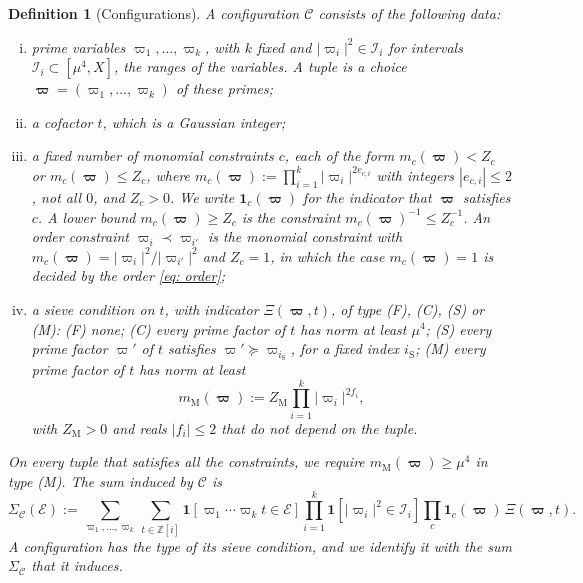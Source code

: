 \documentclass{article}
\numberwithin{equation}{section}
\newtheorem{definition}{Definition}
\newcommand{\Le}{\leqslant}
\newcommand{\Ge}{\geqslant}
\begin{document}
\begin{definition}[Configurations]
\label{def: configuration}
A \emph{configuration} $\mathcal{C}$ consists of the following data:
\begin{enumerate}[(i)]
\item prime variables $\varpi_1, \dots, \varpi_k$, with $k$ fixed and $|\varpi_i|^2 \in \mathcal{I}_i$ for intervals $\mathcal{I}_i \subset [\mu^4, X]$, the \emph{ranges} of the variables. A \emph{tuple} is a choice $\boldsymbol{\varpi} = (\varpi_1, \dots, \varpi_k)$ of these primes;
\item a cofactor $t$, which is a Gaussian integer;
\item a fixed number of \emph{monomial constraints} $c$, each of the form $m_c(\boldsymbol{\varpi}) < Z_c$ or $m_c(\boldsymbol{\varpi}) \Le Z_c$, where $m_c(\boldsymbol{\varpi}) := \prod_{i=1}^{k} |\varpi_i|^{2e_{c,i}}$ with integers $|e_{c,i}| \Le 2$, not all $0$, and $Z_c > 0$. We write $\mathbf{1}_c(\boldsymbol{\varpi})$ for the indicator that $\boldsymbol{\varpi}$ satisfies $c$. A lower bound $m_c(\boldsymbol{\varpi}) \Ge Z_c$ is the constraint $m_c(\boldsymbol{\varpi})^{-1} \Le Z_c^{-1}$. An \emph{order constraint} $\varpi_i \prec \varpi_{i'}$ is the monomial constraint with $m_c(\boldsymbol{\varpi}) = |\varpi_i|^2/|\varpi_{i'}|^2$ and $Z_c = 1$, in which the case $m_c(\boldsymbol{\varpi}) = 1$ is decided by the order \eqref{eq: order};
\item a \emph{sieve condition} on $t$, with indicator $\Xi(\boldsymbol{\varpi}, t)$, of \emph{type} (F), (C), (S) or (M): (F) none; (C) every prime factor of $t$ has norm at least $\mu^4$; (S) every prime factor $\varpi'$ of $t$ satisfies $\varpi' \succcurlyeq \varpi_{i_{\mathrm{S}}}$, for a fixed index $i_{\mathrm{S}}$; (M) every prime factor of $t$ has norm at least
\begin{equation}
\label{eq: type M level}
m_{\mathrm{M}}(\boldsymbol{\varpi}) := Z_{\mathrm{M}} \prod_{i=1}^{k} |\varpi_i|^{2f_i},
\end{equation}
with $Z_{\mathrm{M}} > 0$ and reals $|f_i| \Le 2$ that do not depend on the tuple.
\end{enumerate}
On every tuple that satisfies all the constraints, we require $m_{\mathrm{M}}(\boldsymbol{\varpi}) \Ge \mu^4$ in type (M). The \emph{sum induced by} $\mathcal{C}$ is
\begin{equation}
\label{eq: configuration sum}
\Sigma_{\mathcal{C}}(\mathcal{E}) := \sum_{\varpi_1, \dots, \varpi_k} \sum_{t \in \mathbb{Z}[i]} \mathbf{1}[\varpi_1 \cdots \varpi_k t \in \mathcal{E}] \prod_{i=1}^{k} \mathbf{1}[|\varpi_i|^2 \in \mathcal{I}_i] \prod_c \mathbf{1}_c(\boldsymbol{\varpi})\, \Xi(\boldsymbol{\varpi}, t).
\end{equation}
A configuration has the type of its sieve condition, and we identify it with the sum $\Sigma_{\mathcal{C}}$ that it induces.
\end{definition}
\end{document}

